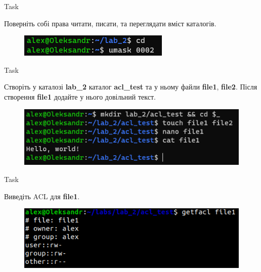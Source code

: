 \documentclass[a4paper,12pt]{article}
\newcommand{\RomanNumeralCaps}[1]{\MakeUppercase{\romannumeral #1}}
\begin{document}
\newpage
    \begin{center}
        \Large{Task \RomanNumeralCaps{14}}
    \end{center}
    Поверніть собі права читати, писати, та переглядати вміст каталогів.
    \begin{figure}[h!]
        \begin{minipage}[h]{1\linewidth}
            \centering
            \includegraphics[width=0.6\linewidth]{Prt sc/Figure_14.png}  
        \end{minipage}
    \end{figure}

    \begin{center}
        \Large{Task \RomanNumeralCaps{15}}
    \end{center}
    Створіть у каталозі \textbf{lab\_2} каталог \textbf{acl\_test} та у ньому файли \textbf{file1}, \textbf{file2}. Після створення \textbf{file1} додайте у 
    нього довільний текст.
    \begin{figure}[h!]
        \begin{minipage}[h]{1\linewidth}
            \centering
            \includegraphics[width=0.6\linewidth]{Prt sc/Figure_15.png}  
        \end{minipage}
    \end{figure}

    \begin{center}
        \Large{Task \RomanNumeralCaps{16}}
    \end{center}
    Виведіть ACL для \textbf{file1}.
    \begin{figure}[h!]
        \begin{minipage}[h]{1\linewidth}
            \centering
            \includegraphics[width=0.6\linewidth]{Prt sc/Figure_16.png}  
        \end{minipage}
    \end{figure}
\end{document}
